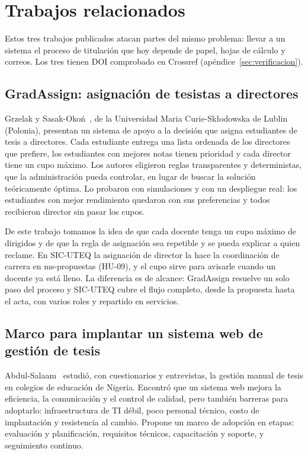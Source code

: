 \section{Trabajos relacionados}\label{sec:trabajos}

Estos tres trabajos publicados atacan partes del mismo problema: llevar a un sistema el proceso de titulación que hoy depende de papel, hojas de cálculo y correos. Los tres tienen DOI comprobado en Crossref (apéndice~\ref{sec:verificacion}).

\subsection{GradAssign: asignación de tesistas a directores}

Grzelak y Sasak-Okoń~\cite{grzelak2026gradassign}, de la Universidad Maria Curie-Skłodowska de Lublin (Polonia), presentan un sistema de apoyo a la decisión que asigna estudiantes de tesis a directores. Cada estudiante entrega una lista ordenada de los directores que prefiere, los estudiantes con mejores notas tienen prioridad y cada director tiene un cupo máximo. Los autores eligieron reglas transparentes y deterministas, que la administración pueda controlar, en lugar de buscar la solución teóricamente óptima. Lo probaron con simulaciones y con un despliegue real: los estudiantes con mejor rendimiento quedaron con sus preferencias y todos recibieron director sin pasar los cupos.

De este trabajo tomamos la idea de que cada docente tenga un cupo máximo de dirigidos y de que la regla de asignación sea repetible y se pueda explicar a quien reclame. En SIC-UTEQ la asignación de director la hace la coordinación de carrera en ms-propuestas (HU-09), y el cupo sirve para avisarle cuando un docente ya está lleno. La diferencia es de alcance: GradAssign resuelve un solo paso del proceso y SIC-UTEQ cubre el flujo completo, desde la propuesta hasta el acta, con varios roles y repartido en servicios.

\subsection{Marco para implantar un sistema web de gestión de tesis}

Abdul-Salaam~\cite{abdulsalaam2024framework} estudió, con cuestionarios y entrevistas, la gestión manual de tesis en colegios de educación de Nigeria. Encontró que un sistema web mejora la eficiencia, la comunicación y el control de calidad, pero también barreras para adoptarlo: infraestructura de TI débil, poco personal técnico, costo de implantación y resistencia al cambio. Propone un marco de adopción en etapas: evaluación y planificación, requisitos técnicos, capacitación y soporte, y seguimiento continuo.

